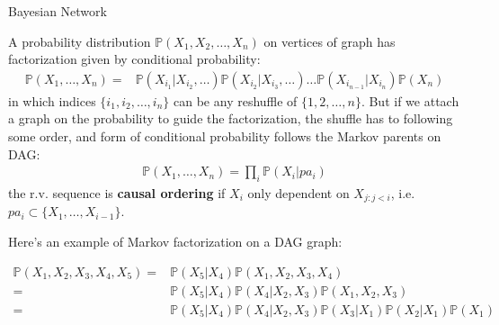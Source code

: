 \begin{point}
    Bayesian Network
\end{point}

A probability distribution $ \mathbb{P}\left( X_1,X_2,\ldots,X_n \right) $ on vertices of graph has factorization given by conditional probability:
\begin{align}
    \mathbb{P}\left( X_1,\ldots,X_n \right) = &\mathbb{P}\left( X_{i_1}|X_{i_2},\ldots \right)\mathbb{P}\left( X_{i_2}|X_{i_3},\ldots \right)\ldots\mathbb{P}\left( X_{i_{n-1}}|X_{i_n} \right) \mathbb{P}\left( X_n \right)    
\end{align}
in which indices $ \{i_1,i_2,\ldots,i_n\} $ can be any reshuffle of $ \{1,2,\ldots,n\} $. But if we attach a graph on the probability to guide the factorization, the shuffle has to following some order, and form of conditional probability follows the Markov parents on DAG:
\begin{align}
    \mathbb{P}\left( X_1,\ldots,X_n \right)=\prod_{i}\mathbb{P}\left( X_i|pa_i \right)
\end{align}
the r.v. sequence is \textbf{causal ordering} if $ X_i $ only dependent on $ X_{j:j<i} $, i.e. $ pa_i\subset \{X_1,\ldots,X_{i-1}\} $.

Here's an example of Markov factorization on a DAG graph:




    \begin{center}
    \begin{minipage}{0.7\linewidth}
        \begin{align}
            \mathbb{P}\left( X_1,X_2,X_3,X_4,X_5 \right) = & \mathbb{P}\left( X_5|X_4 \right) \mathbb{P}\left( X_1,X_2,X_3,X_4 \right) \\
            =&\mathbb{P}\left( X_5|X_4 \right) \mathbb{P}\left( X_4|X_2,X_3 \right) \mathbb{P}\left( X_1,X_2,X_3 \right) \\
            =&\mathbb{P}\left( X_5|X_4 \right) \mathbb{P}\left( X_4|X_2,X_3 \right) \mathbb{P}\left( X_3|X_1 \right) \mathbb{P}\left( X_2|X_1 \right) \mathbb{P}\left( X_1 \right)  \quad\,       
        \end{align}
    \end{minipage}
    \end{center}

